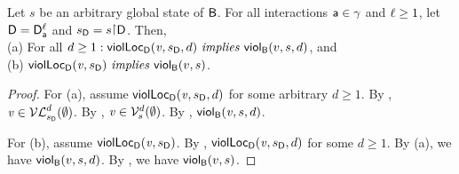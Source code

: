 \begin{proposition}
\label{prop:locScViol-implies-scViol}
\label{prop:lviol-implies-viol}
Let $s$ be an arbitrary global state of $\B$.
For all interactions $\act \in \gamma$ and $\l \ge 1$, let $\DS = \dsks{\act}{\l}$ and $\sD = s \pj \dsk{\act}{\l}$.
Then,\\
(a) For all $d \ge 1:  \scVLd{\ndv}{d}{\sD}{\act}{\l}\ \impliess\ \scVd{v}{d}{s} $, and\\
(b) $\scVL{\ndv}{\sD}{\act}{\l}\ \impliess\ \scV{v}{s}$.
\end{proposition}
%
\begin{proof}
For (a), assume $\scVLd{\ndv}{d}{\sD}{\act}{\l}$ for some arbitrary $d \ge 1$.
By ,  $\ndv \in \lVFsi{\sD}{\ewfg}{d}$.
By ,  $\ndv  \in \VFsi{s}{\ewfg}{d}$.
By , $\scVd{\ndv}{d}{s}$.

For (b), assume $\scVL{\ndv}{\sD}{\act}{\l}$. By ,
$\scVLd{\ndv}{d}{\sD}{\act}{\l}$ for some $d \ge 1$. By (a), we have $\scVd{v}{d}{s}$.
By , we have $\scV{v}{s}$.
\end{proof}
